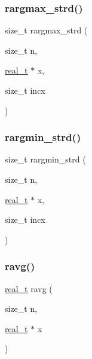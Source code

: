 \subsubsection{\texorpdfstring{rargmax\+\_\+strd()}{rargmax\_strd()}}
{\footnotesize\ttfamily size\+\_\+t rargmax\+\_\+strd (\begin{DoxyParamCaption}\item[{size\+\_\+t}]{n,  }\item[{\hyperlink{a00876_a1924a4f6907cc3833213aba1f07fcbe9}{real\+\_\+t} $\ast$}]{x,  }\item[{size\+\_\+t}]{incx }\end{DoxyParamCaption})}

\mbox{\label{a00951_a5c1520d225b740830c9d04bf53db47e6}} 
\subsubsection{\texorpdfstring{rargmin\+\_\+strd()}{rargmin\_strd()}}
{\footnotesize\ttfamily size\+\_\+t rargmin\+\_\+strd (\begin{DoxyParamCaption}\item[{size\+\_\+t}]{n,  }\item[{\hyperlink{a00876_a1924a4f6907cc3833213aba1f07fcbe9}{real\+\_\+t} $\ast$}]{x,  }\item[{size\+\_\+t}]{incx }\end{DoxyParamCaption})}

\mbox{\label{a00951_aa73b5c45f4ae5e453c00f7aaf9401723}} 
\subsubsection{\texorpdfstring{ravg()}{ravg()}}
{\footnotesize\ttfamily \hyperlink{a00876_a1924a4f6907cc3833213aba1f07fcbe9}{real\+\_\+t} ravg (\begin{DoxyParamCaption}\item[{size\+\_\+t}]{n,  }\item[{\hyperlink{a00876_a1924a4f6907cc3833213aba1f07fcbe9}{real\+\_\+t} $\ast$}]{x }\end{DoxyParamCaption})}

